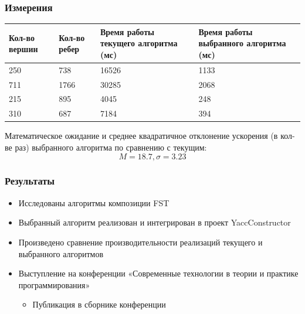 \documentclass{beamer}
\begin{document}
\begin{frame}
  \transwipe[direction=90]
  \frametitle{Измерения}
    \begin{center}
        \begin{tabular}{ | p{1.5cm} | p{1.5cm} | p{3.2cm} | p{3.4cm} | }
        \hline
        Кол-во вершин & Кол-во ребер & 
        Время работы текущего алгоритма (мс) & 
        Время работы выбранного алгоритма (мс) \\ \hline
        250 & 738 & 16526 & 1133 \\ \hline
        711 & 1766 & 30285 & 2068 \\ \hline
        215 & 895 & 4045 & 248 \\ \hline
        310 & 687 & 7184 & 394 \\ \hline
        \end{tabular}
    \end{center}
    Математическое ожидание и среднее квадратичное отклонение ускорения (в кол-ве раз) выбранного алгоритма по сравнению с текущим:
    \[M = 18.7, \sigma = 3.23\]
\end{frame}

\begin{frame}
  \transwipe[direction=90]
  \frametitle{Результаты}
  \begin{itemize}
    \item Исследованы алгоритмы композиции FST
    \item Выбранный алгоритм реализован и интегрирован в проект YaccConstructor
    \item Произведено сравнение производительности реализаций текущего и выбранного алгоритмов
    \item Выступление на конференции «Современные технологии в теории и практике программирования»
    \begin{itemize}
      \item Публикация в сборнике конференции
    \end{itemize}
  \end{itemize}
\end{frame}
\end{document}
